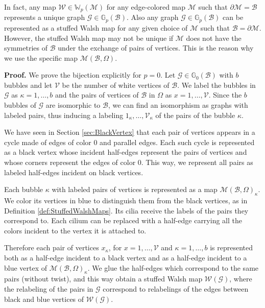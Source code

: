\documentclass[aps,prd,10pt,notitlepage,nofootinbib,superscriptaddress,showkeys,showpacs]{revtex4-1}
\begin{document}
In fact, any map ${\mathcal{W}}\in {\mathbb{W}}_p({\mathcal{M}})$ for any edge-colored map ${\mathcal{M}}$ such that $\partial {\mathcal{M}} = {\mathcal{B}}$ represents a unique graph ${\mathcal{G}}\in {\mathbb{G}}_p({\mathcal{B}})$. Also any graph ${\mathcal{G}}\in {\mathbb{G}}_p({\mathcal{B}})$ can be represented as a stuffed Walsh map for any given choice of ${\mathcal{M}}$ such that ${\mathcal{B}} = \partial {\mathcal{M}}$. However, the stuffed Walsh map may not be unique if ${\mathcal{M}}$ does not have the symmetries of ${\mathcal{B}}$ under the exchange of pairs of vertices. This is the reason why we use the specific map ${\mathcal{M}}({\mathcal{B}}, \Omega)$.

{\bf Proof.} We prove the bijection explicitly for $p=0$. Let ${\mathcal{G}}\in{\mathbb{G}}_0({\mathcal{B}})$ with $b$ bubbles and let ${\mathcal{V}}$ be the number of white vertices of ${\mathcal{B}}$. We label the bubbles in ${\mathcal{G}}$ as $\kappa = 1, \dotsc, b$ and the pairs of vertices of ${\mathcal{B}}$ in $\Omega$ as $x = 1, \dotsc, {\mathcal{V}}$. Since the $b$ bubbles of ${\mathcal{G}}$ are isomorphic to ${\mathcal{B}}$, we can find an isomorphism as graphs with labeled pairs, thus inducing a labeling $1_\kappa, \dotsc, {\mathcal{V}}_\kappa$ of the pairs of the bubble $\kappa$. 

We have seen in Section \ref{sec:BlackVertex} that each pair of vertices appears in a cycle made of edges of color 0 and parallel edges. Each such cycle is represented as a black vertex whose incident half-edges represent the pairs of vertices and whose corners represent the edges of color 0. This way, we represent all pairs as labeled half-edges incident on black vertices.

Each bubble $\kappa$ with labeled pairs of vertices is represented as a map ${\mathcal{M}}({\mathcal{B}}, \Omega)_\kappa$. We color its vertices in blue to distinguish them from the black vertices, as in Definition \ref{def:StuffedWalshMaps}. Its cilia receive the labels of the pairs they correspond to. Each cilium can be replaced with a half-edge carrying all the colors incident to the vertex it is attached to.

Therefore each pair of vertices $x_\kappa$, for $x=1, \dotsc, {\mathcal{V}}$ and $\kappa = 1, \dotsc, b$ is represented both as a half-edge incident to a black vertex and as a half-edge incident to a blue vertex of ${\mathcal{M}}({\mathcal{B}}, \Omega)_\kappa$. We glue the half-edges which correspond to the same pairs (without twist), and this way obtain a stuffed Walsh map ${\mathcal{W}}({\mathcal{G}})$, where the relabeling of the pairs in ${\mathcal{G}}$ correspond to relabelings of the edges between black and blue vertices of ${\mathcal{W}}({\mathcal{G}})$.
\end{document}
